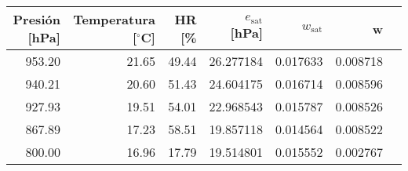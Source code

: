 \begin{tabular}{rrrrrrr}
\toprule
Presión [hPa] &  Temperatura [$^{\circ}$C]  &  HR [\%
              &     $e_\text{sat}$ [hPa] &    $w_\text{sat}$ &        w \\
\midrule
   953.20 & 21.65 & 49.44 & 26.277184 & 0.017633 & 0.008718 \\
   940.21 & 20.60 & 51.43 & 24.604175 & 0.016714 & 0.008596 \\
   927.93 & 19.51 & 54.01 & 22.968543 & 0.015787 & 0.008526 \\
   867.89 & 17.23 & 58.51 & 19.857118 & 0.014564 & 0.008522 \\
   800.00 & 16.96 & 17.79 & 19.514801 & 0.015552 & 0.002767 \\
\bottomrule
\end{tabular}
